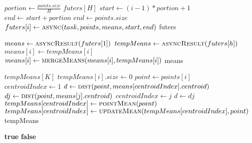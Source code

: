 \documentclass[a4paper, 12pt]{article}
\begin{document}
\begin{algorithm}[H]
\begin{algorithmic}[1]
\State \(portion \gets \displaystyle\frac{points.size}{H}\)
\State \(futers[H]\)
\State \(start \gets (i - 1) * portion + 1\)
\State \(end \gets start + portion\)
\State \(end \gets points.size\)
\EndIf
\State \(futers[i] \gets \Call{async}{task, points, means, start, end}\)
\EndFor
\State \Return futers
\EndFunction
\end{algorithmic}
\end{algorithm}
\begin{algorithm}[H]
\begin{algorithmic}[1]
\State \(means \gets \Call{asyncResult}{futers[1]}\)
\State \(tempMeans \gets \Call{asyncResult}{futers[h]}\)
\State \(means[i] \gets tempMeans[i]\)
\Else
{}
\State \(means[i] \gets \Call{mergeMeans}{means[i], tempMeans[i]}\)
\EndIf
\EndIf
\EndFor
\EndFor
\State \Return means
\EndFunction
\end{algorithmic}
\end{algorithm}
\begin{algorithm}[H]
\begin{algorithmic}[1]
\State \(tempMeans[K]\)
\State \(tempMeans[i].size \gets 0\)
\EndFor
{}
\State \(point \gets points[i]\)
\State \(centroidIndex \gets 1\)
\State \(d \gets \Call{dist}{point, means[centroidIndex].centroid}\)
\State \(dj \gets \Call{dist}{point, means[j].centroid}\)
    \State \(centroidIndex \gets j\)
    \State \(d \gets dj\)
\EndIf
\EndFor
{}
\State \(tempMeans[centroidIndex] \gets \Call{pointMean}{point}\)
\Else
\State \(tempMeans[centroidIndex] \gets \Call{updateMean}{tempMeans[centroidIndex], point}\)
\EndIf
\EndFor
\State \Return tempMeans 
\EndFunction
\end{algorithmic}
\end{algorithm}
\begin{algorithm}[H]
\begin{algorithmic}[1]
\State \Return \textbf{true}
\EndIf
\EndFor
\State \Return \textbf{false}
\EndFunction
\end{algorithmic}
\end{algorithm}
\end{document}

